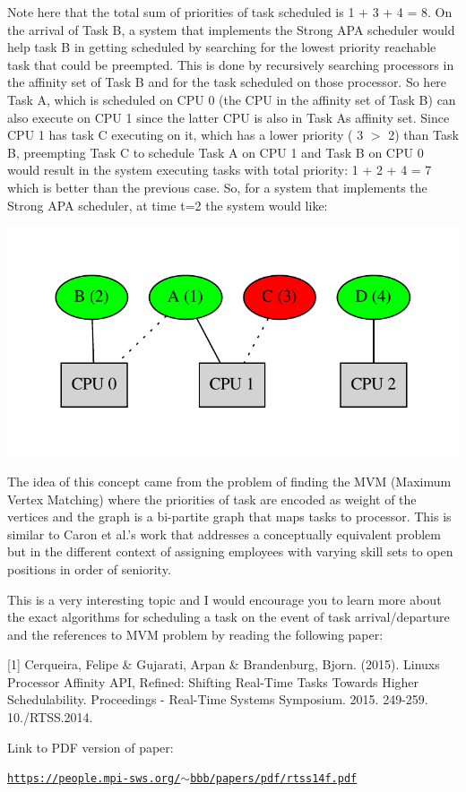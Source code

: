 Note here that the total sum of priorities of task scheduled is 1 + 3 + 4 = 8. On the arrival of Task B, a system that implements the Strong A\+PA scheduler would help task B in getting scheduled by searching for the lowest priority reachable task that could be preempted. This is done by recursively searching processors in the affinity set of Task B and for the task scheduled on those processor. So here Task A, which is scheduled on C\+PU 0 (the C\+PU in the affinity set of Task B) can also execute on C\+PU 1 since the latter C\+PU is also in Task A\textquotesingle{}s affinity set. Since C\+PU 1 has task C executing on it, which has a lower priority ( 3 $>$ 2) than Task B, preempting Task C to schedule Task A on C\+PU 1 and Task B on C\+PU 0 would result in the system executing tasks with total priority\+: 1 + 2 + 4 = 7 which is better than the previous case. So, for a system that implements the Strong A\+PA scheduler, at time t=2 the system would like\+:


\begin{DoxyImageNoCaption}
  \mbox{\includegraphics[width=\textwidth,height=\textheight/2,keepaspectratio=true]{dot_inline_dotgraph_4}}
\end{DoxyImageNoCaption}


The idea of this concept came from the problem of finding the M\+VM (Maximum Vertex Matching) where the priorities of task are encoded as weight of the vertices and the graph is a bi-\/partite graph that maps tasks to processor. This is similar to Caron et al.\+’s work that addresses a conceptually equivalent problem but in the different context of assigning employees with varying skill sets to open positions in order of seniority.

This is a very interesting topic and I would encourage you to learn more about the exact algorithms for scheduling a task on the event of task arrival/departure and the references to M\+VM problem by reading the following paper\+:

\mbox{[}1\mbox{]} Cerqueira, Felipe \& Gujarati, Arpan \& Brandenburg, Bjorn. (2015). Linux\textquotesingle{}s Processor Affinity A\+PI, Refined\+: Shifting Real-\/\+Time Tasks Towards Higher Schedulability. Proceedings -\/ Real-\/\+Time Systems Symposium. 2015. 249-\/259. 10./\+R\+T\+SS.2014.

Link to P\+DF version of paper\+:

\href{https://people.mpi-sws.org/~bbb/papers/pdf/rtss14f.pdf}{\tt https\+://people.\+mpi-\/sws.\+org/$\sim$bbb/papers/pdf/rtss14f.\+pdf} 